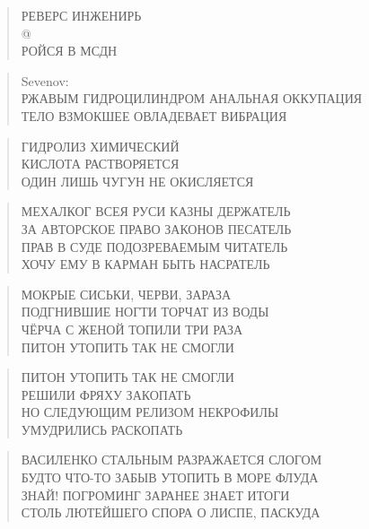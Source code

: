 \poemtitle{***}
\begin{verse}
РЕВЕРС ИНЖЕНИРЬ\\
@\\
РОЙСЯ В МСДН
\end{verse}

\poemtitle{***}
\begin{verse}
Sevenov: \\
РЖАВЫМ ГИДРОЦИЛИНДРОМ АНАЛЬНАЯ ОККУПАЦИЯ\\
ТЕЛО ВЗМОКШЕЕ ОВЛАДЕВАЕТ ВИБРАЦИЯ
\end{verse}

\poemtitle{***}
\begin{verse}
ГИДРОЛИЗ ХИМИЧЕСКИЙ\\
КИСЛОТА РАСТВОРЯЕТСЯ\\
ОДИН ЛИШЬ ЧУГУН НЕ ОКИСЛЯЕТСЯ
\end{verse}

\poemtitle{***}
\begin{verse}
МЕХАЛКОГ ВСЕЯ РУСИ КАЗНЫ ДЕРЖАТЕЛЬ\\
ЗА АВТОРСКОЕ ПРАВО ЗАКОНОВ ПЕСАТЕЛЬ\\
ПРАВ В СУДЕ ПОДОЗРЕВАЕМЫМ ЧИТАТЕЛЬ\\
ХОЧУ ЕМУ В КАРМАН БЫТЬ НАСРАТЕЛЬ
\end{verse}

\poemtitle{***}
\begin{verse}
МОКРЫЕ СИСЬКИ, ЧЕРВИ, ЗАРАЗА\\
ПОДГНИВШИЕ НОГТИ ТОРЧАТ ИЗ ВОДЫ\\
ЧЁРЧА С ЖЕНОЙ ТОПИЛИ ТРИ РАЗА\\
ПИТОН УТОПИТЬ ТАК НЕ СМОГЛИ
\end{verse}

\poemtitle{***}
\begin{verse}
ПИТОН УТОПИТЬ ТАК НЕ СМОГЛИ\\
РЕШИЛИ ФРЯХУ ЗАКОПАТЬ\\
НО СЛЕДУЮЩИМ РЕЛИЗОМ НЕКРОФИЛЫ\\
УМУДРИЛИСЬ РАСКОПАТЬ
\end{verse}

\poemtitle{***}
\begin{verse}
ВАСИЛЕНКО СТАЛЬНЫМ РАЗРАЖАЕТСЯ СЛОГОМ\\
БУДТО ЧТО-ТО ЗАБЫВ УТОПИТЬ В МОРЕ ФЛУДА\\
ЗНАЙ! ПОГРОМИНГ ЗАРАНЕЕ ЗНАЕТ ИТОГИ\\
СТОЛЬ ЛЮТЕЙШЕГО СПОРА О ЛИСПЕ, ПАСКУДА
\end{verse}

